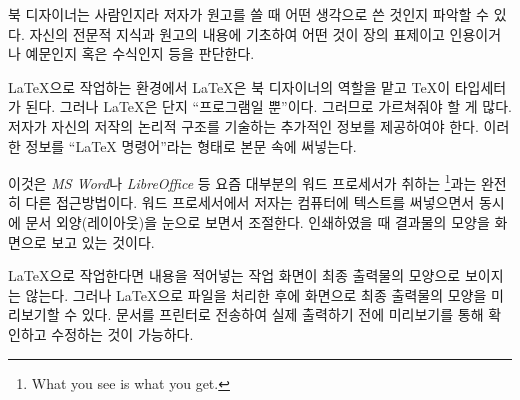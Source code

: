 북 디자이너는 사람인지라 저자가 원고를 쓸 때 어떤 생각으로 쓴 것인지 파악할 수 있다.
자신의 전문적 지식과 원고의 내용에 기초하여 어떤 것이 장의 표제이고 인용이거나 예문인지 혹은 수식인지 등을 판단한다.

\LaTeX 으로 작업하는 환경에서 \LaTeX 은 북 디자이너의 역할을 맡고 \TeX 이 타입세터가 된다.
그러나 \LaTeX 은 단지 ``프로그램일 뿐''이다. 그러므로 가르쳐줘야 할 게 많다.
저자가 자신의 저작의 논리적 구조를 기술하는 추가적인 정보를 제공하여야 한다.
이러한 정보를 ``\LaTeX{} 명령어''라는 형태로 본문 속에 써넣는다.

이것은 \emph{MS Word}나 \emph{LibreOffice} 등 요즘 대부분의 워드 프로세서가 취하는 \footnote{What you see is what you get.}과는
완전히 다른 접근방법이다. 워드 프로세서에서 저자는 컴퓨터에 텍스트를 써넣으면서 동시에 문서 외양(레이아웃)을 눈으로 보면서 조절한다.
인쇄하였을 때 결과물의 모양을 화면으로 보고 있는 것이다.

\LaTeX 으로 작업한다면 내용을 적어넣는 작업 화면이 최종 출력물의 모양으로 보이지는 않는다.
그러나 \LaTeX 으로 파일을 처리한 후에 화면으로 최종 출력물의 모양을 미리보기할 수 있다.
문서를 프린터로 전송하여 실제 출력하기 전에 미리보기를 통해 확인하고 수정하는 것이 가능하다.

